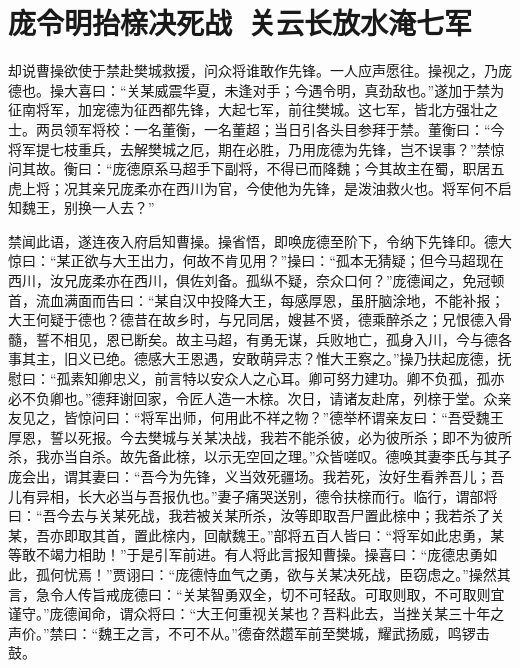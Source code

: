 \chapter{庞令明抬榇决死战~关云长放水淹七军}

却说曹操欲使于禁赴樊城救援，问众将谁敢作先锋。一人应声愿往。操视之，乃庞德也。操大喜曰：“关某威震华夏，未逢对手；今遇令明，真劲敌也。”遂加于禁为征南将军，加宠德为征西都先锋，大起七军，前往樊城。这七军，皆北方强壮之士。两员领军将校：一名董衡，一名董超；当日引各头目参拜于禁。董衡曰：“今将军提七枝重兵，去解樊城之厄，期在必胜，乃用庞德为先锋，岂不误事？”禁惊问其故。衡曰：“庞德原系马超手下副将，不得已而降魏；今其故主在蜀，职居五虎上将；况其亲兄庞柔亦在西川为官，今使他为先锋，是泼油救火也。将军何不启知魏王，别换一人去？”

禁闻此语，遂连夜入府启知曹操。操省悟，即唤庞德至阶下，令纳下先锋印。德大惊曰：“某正欲与大王出力，何故不肯见用？”操曰：“孤本无猜疑；但今马超现在西川，汝兄庞柔亦在西川，俱佐刘备。孤纵不疑，奈众口何？”庞德闻之，免冠顿首，流血满面而告曰：“某自汉中投降大王，每感厚恩，虽肝脑涂地，不能补报；大王何疑于德也？德昔在故乡时，与兄同居，嫂甚不贤，德乘醉杀之；兄恨德入骨髓，誓不相见，恩已断矣。故主马超，有勇无谋，兵败地亡，孤身入川，今与德各事其主，旧义已绝。德感大王恩遇，安敢萌异志？惟大王察之。”操乃扶起庞德，抚慰曰：“孤素知卿忠义，前言特以安众人之心耳。卿可努力建功。卿不负孤，孤亦必不负卿也。”德拜谢回家，令匠人造一木榇。次日，请诸友赴席，列榇于堂。众亲友见之，皆惊问曰：“将军出师，何用此不祥之物？”德举杯谓亲友曰：“吾受魏王厚恩，誓以死报。今去樊城与关某决战，我若不能杀彼，必为彼所杀；即不为彼所杀，我亦当自杀。故先备此榇，以示无空回之理。”众皆嗟叹。德唤其妻李氏与其子庞会出，谓其妻曰：“吾今为先锋，义当效死疆场。我若死，汝好生看养吾儿；吾儿有异相，长大必当与吾报仇也。”妻子痛哭送别，德令扶榇而行。临行，谓部将曰：“吾今去与关某死战，我若被关某所杀，汝等即取吾尸置此榇中；我若杀了关某，吾亦即取其首，置此榇内，回献魏王。”部将五百人皆曰：“将军如此忠勇，某等敢不竭力相助！”于是引军前进。有人将此言报知曹操。操喜曰：“庞德忠勇如此，孤何忧焉！”贾诩曰：“庞德恃血气之勇，欲与关某决死战，臣窃虑之。”操然其言，急令人传旨戒庞德曰：“关某智勇双全，切不可轻敌。可取则取，不可取则宜谨守。”庞德闻命，谓众将曰：“大王何重视关某也？吾料此去，当挫关某三十年之声价。”禁曰：“魏王之言，不可不从。”德奋然趱军前至樊城，耀武扬威，鸣锣击鼓。

